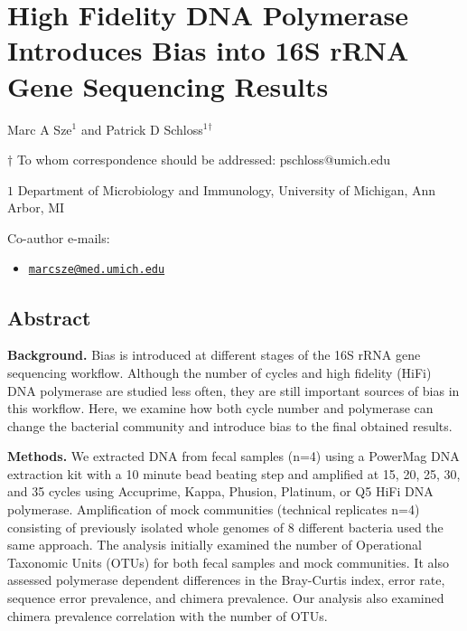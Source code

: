 \documentclass[12pt,]{article}
\title{}
\author{}
\date{}
\providecommand{\tightlist}{%
  \setlength{\itemsep}{0pt}\setlength{\parskip}{0pt}}
\begin{document}
\section{High Fidelity DNA Polymerase Introduces Bias into 16S rRNA Gene
Sequencing
Results}\label{high-fidelity-dna-polymerase-introduces-bias-into-16s-rrna-gene-sequencing-results}

\begin{center}
\vspace{25mm}

Marc A Sze${^1}$ and Patrick D Schloss${^1}$${^\dagger}$

\vspace{20mm}

$\dagger$ To whom correspondence should be addressed: pschloss@umich.edu

$1$ Department of Microbiology and Immunology, University of Michigan, Ann Arbor, MI




\end{center}

Co-author e-mails:

\begin{itemize}
\tightlist
\item
  \href{mailto:marcsze@med.umich.edu}{\nolinkurl{marcsze@med.umich.edu}}
\end{itemize}

\newpage

\linenumbers

\subsection{Abstract}\label{abstract}

\textbf{Background.} Bias is introduced at different stages of the 16S
rRNA gene sequencing workflow. Although the number of cycles and high
fidelity (HiFi) DNA polymerase are studied less often, they are still
important sources of bias in this workflow. Here, we examine how both
cycle number and polymerase can change the bacterial community and
introduce bias to the final obtained results.

\textbf{Methods.} We extracted DNA from fecal samples (n=4) using a
PowerMag DNA extraction kit with a 10 minute bead beating step and
amplified at 15, 20, 25, 30, and 35 cycles using Accuprime, Kappa,
Phusion, Platinum, or Q5 HiFi DNA polymerase. Amplification of mock
communities (technical replicates n=4) consisting of previously isolated
whole genomes of 8 different bacteria used the same approach. The
analysis initially examined the number of Operational Taxonomic Units
(OTUs) for both fecal samples and mock communities. It also assessed
polymerase dependent differences in the Bray-Curtis index, error rate,
sequence error prevalence, and chimera prevalence. Our analysis also
examined chimera prevalence correlation with the number of OTUs.
\end{document}
